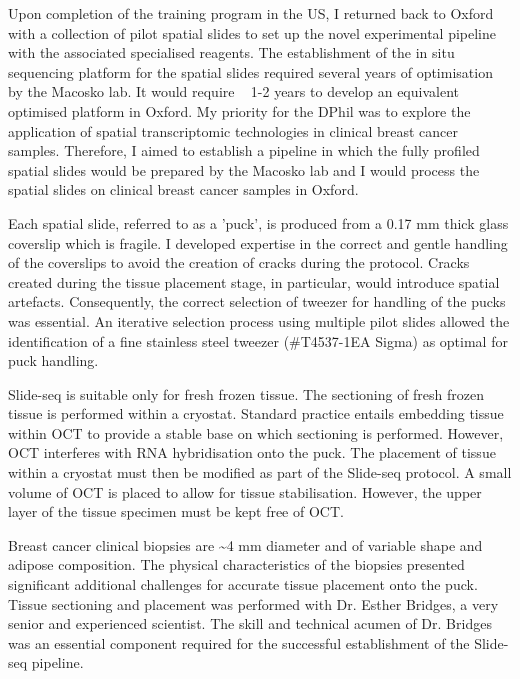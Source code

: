 Upon completion of the training program in the US, I returned back to Oxford with a collection of pilot spatial slides to set up the novel experimental pipeline with the associated specialised reagents. The establishment of the in situ sequencing platform for the spatial slides required several years of optimisation by the Macosko lab. It would require ~ 1-2 years to develop an equivalent optimised platform in Oxford. My priority for the DPhil was to explore the application of spatial transcriptomic technologies in clinical breast cancer samples. Therefore, I aimed to establish a pipeline in which the fully profiled spatial slides would be prepared by the Macosko lab and I would process the spatial slides on clinical breast cancer samples in Oxford.

Each spatial slide, referred to as a 'puck', is produced from a 0.17 mm thick glass coverslip which is fragile. I developed expertise in the correct and gentle handling of the coverslips to avoid the creation of cracks during the protocol. Cracks created during the tissue placement stage, in particular, would introduce spatial artefacts. Consequently, the correct selection of tweezer for handling of the pucks was essential. An iterative selection process using multiple pilot slides allowed the identification of a fine stainless steel tweezer (\#T4537-1EA Sigma) as optimal for puck handling.

Slide-seq is suitable only for fresh frozen tissue. The sectioning of fresh frozen tissue is performed within a cryostat. Standard practice entails embedding tissue within OCT to provide a stable base on which sectioning is performed. However, OCT interferes with RNA hybridisation onto the puck. The placement of tissue within a cryostat must then be modified as part of the Slide-seq protocol. A small volume of OCT is placed to allow for tissue stabilisation. However, the upper layer of the tissue specimen must be kept free of OCT. 

Breast cancer clinical biopsies are \textasciitilde 4 mm diameter and of variable shape and adipose composition. The physical characteristics of the biopsies presented significant additional challenges for accurate tissue placement onto the puck. Tissue sectioning and placement was performed with Dr. Esther Bridges, a very senior and experienced scientist. The skill and technical acumen of Dr. Bridges was an essential component required for the successful establishment of the Slide-seq pipeline.


